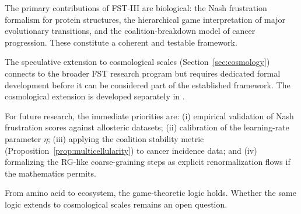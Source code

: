 \documentclass[12pt,a4paper]{article}
\theoremstyle{remark}
\begin{document}
The primary contributions of FST-III are biological: the Nash frustration formalism for protein structures, the hierarchical game interpretation of major evolutionary transitions, and the coalition-breakdown model of cancer progression. These constitute a coherent and testable framework.

The speculative extension to cosmological scales (Section~\ref{sec:cosmology}) connects to the broader FST research program but requires dedicated formal development before it can be considered part of the established framework. The cosmological extension is developed separately in \citep{FST-Unified2026}.

For future research, the immediate priorities are: (i) empirical validation of Nash frustration scores against allosteric datasets; (ii) calibration of the learning-rate parameter $\eta$; (iii) applying the coalition stability metric (Proposition~\ref{prop:multicellularity}) to cancer incidence data; and (iv) formalizing the RG-like coarse-graining steps as explicit renormalization flows if the mathematics permits.

From amino acid to ecosystem, the game-theoretic logic holds. Whether the same logic extends to cosmological scales remains an open question.

\end{document}
